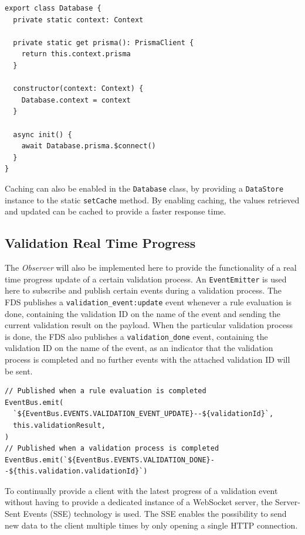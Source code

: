     \begin{lstlisting}[style=es6, caption={ (TypeScript)}]
export class Database {
  private static context: Context

  private static get prisma(): PrismaClient {
    return this.context.prisma
  }

  constructor(context: Context) {
    Database.context = context
  }

  async init() {
    await Database.prisma.$connect()
  }
}
    \end{lstlisting}

    Caching can also be enabled in the \verb;Database; class, by providing a \verb;DataStore; instance to the static \verb;setCache; method. By enabling caching, the values retrieved and updated can be cached to provide a faster response time. 

  \subsection{Validation Real Time Progress}
  
    The \emph{Observer} \autocite[pp. 293-303]{gamma-1995} will also be implemented here to provide the functionality of a real time progress update of a certain validation process. An \verb;EventEmitter; is used here to subscribe and publish certain events during a validation process. The FDS publishes a \verb;validation_event:update; event whenever a rule evaluation is done, containing the validation ID on the name of the event and sending the current validation result on the payload. When the particular validation process is done, the FDS also publishes a \verb;validation_done; event, containing the validation ID on the name of the event, as an indicator that the validation process is completed and no further events with the attached validation ID will be sent. 

    \begin{lstlisting}[style=es6, caption={Publishing events to the EventEmitter on certain validation events (TypeScript)}]
// Published when a rule evaluation is completed
EventBus.emit(
  `${EventBus.EVENTS.VALIDATION_EVENT_UPDATE}--${validationId}`,
  this.validationResult,
)
// Published when a validation process is completed
EventBus.emit(`${EventBus.EVENTS.VALIDATION_DONE}--${this.validation.validationId}`)
    \end{lstlisting}
    
    To continually provide a client with the latest progress of a validation event without having to provide a dedicated instance of a WebSocket server, the Server-Sent Events (SSE)\autocite{rfc8895} technology is used. The SSE enables the possibility to send new data to the client multiple times by only opening a single HTTP connection. 
    
